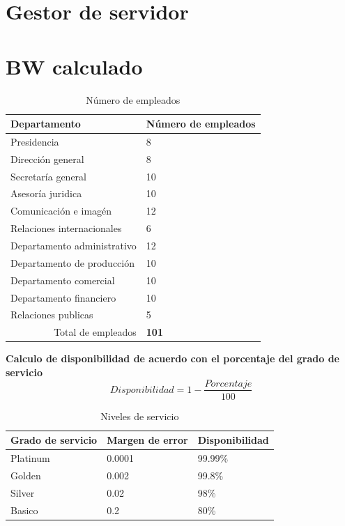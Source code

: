 \documentclass[12pt,letterpaper]{article}
\begin{document}
\section{Gestor de servidor}

\newpage
\section{BW calculado}
\begin{table}[ht]
    \centering
    \begin{tabular}{|l|l|}
    \hline
    Departamento & Número de empleados \\ \hline
    Presidencia & 8 \\ \hline
    Dirección general & 8 \\ \hline
    Secretaría general & 10 \\ \hline
    Asesoría juridica & 10 \\ \hline
    Comunicación e imagén & 12 \\ \hline
    Relaciones internacionales & 6 \\ \hline
    Departamento administrativo & 12 \\ \hline
    Departamento de producción & 10 \\ \hline
    Departamento comercial & 10 \\ \hline
    Departamento financiero & 10 \\ \hline
    Relaciones publicas & 5 \\ \hline
    \multicolumn{1}{|r|}{Total de empleados} & \textbf{101} \\ \hline
    \end{tabular}
    \caption{Número de empleados}
    \label{my-label}
\end{table}

\textbf{Calculo de disponibilidad de acuerdo con el porcentaje del grado de servicio}
\begin{equation}
    Disponibilidad=1-\frac{Porcentaje}{100}
\end{equation}

\begin{table}[ht]
    \centering
    \begin{tabular}{|l|l|l|}
    \hline
    Grado de servicio & Margen de error & Disponibilidad \\ \hline
    Platinum & 0.0001 & 99.99\% \\ \hline
    Golden & 0.002 & 99.8\% \\ \hline
    Silver & 0.02 & 98\% \\ \hline
    Basico & 0.2 & 80\% \\ \hline
    \end{tabular}
    \caption{Niveles de servicio}
    \label{my-label}
\end{table}
\end{document}

